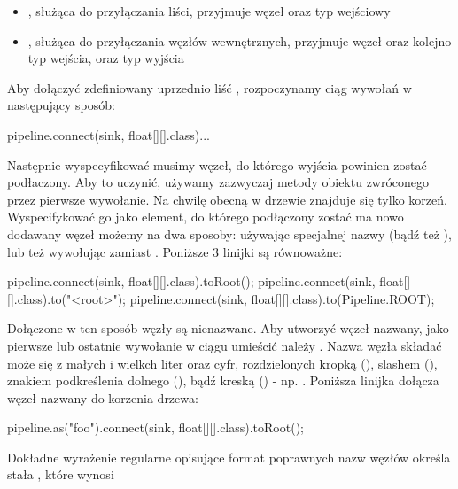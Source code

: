 \begin{itemize}

  \item {}, służąca do przyłączania liści, przyjmuje
    węzeł oraz typ wejściowy

  \item {}, służąca do
    przyłączania węzłów wewnętrznych, przyjmuje węzeł oraz kolejno typ wejścia, oraz typ wyjścia

\end{itemize}

Aby dołączyć zdefiniowany uprzednio liść , rozpoczynamy ciąg wywołań w następujący
sposób:

\begin{java}
pipeline.connect(sink, float[][].class)...
\end{java}

Następnie wyspecyfikować musimy węzeł, do którego wyjścia powinien zostać podłaczony. Aby to
uczynić, używamy zazwyczaj metody  obiektu zwróconego przez pierwsze wywołanie. Na chwilę
obecną w drzewie znajduje się tylko korzeń. Wyspecifykować go jako element, do którego podłączony
zostać ma nowo dodawany węzeł możemy na dwa sposoby: używając specjalnej nazwy  (bądź
też ), lub też wywołując  zamiast . Poniższe 3 linijki są
równoważne:

\begin{java}
pipeline.connect(sink, float[][].class).toRoot();
pipeline.connect(sink, float[][].class).to("<root>");
pipeline.connect(sink, float[][].class).to(Pipeline.ROOT);
\end{java}

Dołączone w ten sposób węzły są nienazwane. Aby utworzyć węzeł nazwany, jako pierwsze lub ostatnie
wywołanie w ciągu umieścić należy . Nazwa węzła składać może się z małych i wielkch
liter oraz cyfr, rozdzielonych kropką (), slashem (\code{/}), znakiem podkreślenia dolnego
(\code{\_}), bądź kreską (\code{-}) - np. .  Poniższa linijka dołącza
węzeł nazwany  do korzenia drzewa:

\begin{java}
pipeline.as("foo").connect(sink, float[][].class).toRoot();
\end{java}

\begin{Note}
Dokładne wyrażenie regularne opisujące format poprawnych nazw węzłów określa stała
, które wynosi \\ \code{[a-zA-Z0-9]([\_./-][a-zA-Z0-9])*}
\end{Note}

